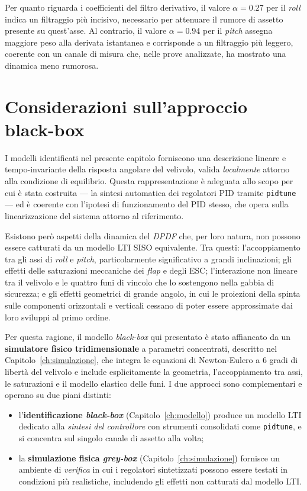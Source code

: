 \documentclass[11pt]{report}
\begin{document}
Per quanto riguarda i coefficienti del filtro derivativo, il valore $\alpha = 0.27$ per il \textit{roll} indica un filtraggio più incisivo, necessario per attenuare il rumore di assetto presente su quest'asse. Al contrario, il valore $\alpha = 0.94$ per il \textit{pitch} assegna maggiore peso alla derivata istantanea e corrisponde a un filtraggio più leggero, coerente con un canale di misura che, nelle prove analizzate, ha mostrato una dinamica meno rumorosa.

\section{Considerazioni sull'approccio black-box}
\label{sec:limiti_blackbox}

I modelli identificati nel presente capitolo forniscono una descrizione lineare e tempo-invariante della risposta angolare del velivolo, valida \textit{localmente} attorno alla condizione di equilibrio. Questa rappresentazione è adeguata allo scopo per cui è stata costruita --- la sintesi automatica dei regolatori PID tramite \texttt{pidtune} --- ed è coerente con l'ipotesi di funzionamento del PID stesso, che opera sulla linearizzazione del sistema attorno al riferimento.

Esistono però aspetti della dinamica del \textit{DPDF} che, per loro natura, non possono essere catturati da un modello LTI SISO equivalente. Tra questi: l'accoppiamento tra gli assi di \textit{roll} e \textit{pitch}, particolarmente significativo a grandi inclinazioni; gli effetti delle saturazioni meccaniche dei \textit{flap} e degli ESC; l'interazione non lineare tra il velivolo e le quattro funi di vincolo che lo sostengono nella gabbia di sicurezza; e gli effetti geometrici di grande angolo, in cui le proiezioni della spinta sulle componenti orizzontali e verticali cessano di poter essere approssimate dai loro sviluppi al primo ordine.

Per questa ragione, il modello \textit{black-box} qui presentato è stato affiancato da un \textbf{simulatore fisico tridimensionale} a parametri concentrati, descritto nel Capitolo~\ref{ch:simulazione}, che integra le equazioni di Newton-Eulero a 6 gradi di libertà del velivolo e include esplicitamente la geometria, l'accoppiamento tra assi, le saturazioni e il modello elastico delle funi. I due approcci sono complementari e operano su due piani distinti:
\begin{itemize}
	\item l'\textbf{identificazione \textit{black-box}} (Capitolo~\ref{ch:modello}) produce un modello LTI dedicato alla \textit{sintesi del controllore} con strumenti consolidati come \texttt{pidtune}, e si concentra sul singolo canale di assetto alla volta;
	\item la \textbf{simulazione fisica \textit{grey-box}} (Capitolo~\ref{ch:simulazione}) fornisce un ambiente di \textit{verifica} in cui i regolatori sintetizzati possono essere testati in condizioni più realistiche, includendo gli effetti non catturati dal modello LTI.
\end{itemize}
\end{document}
